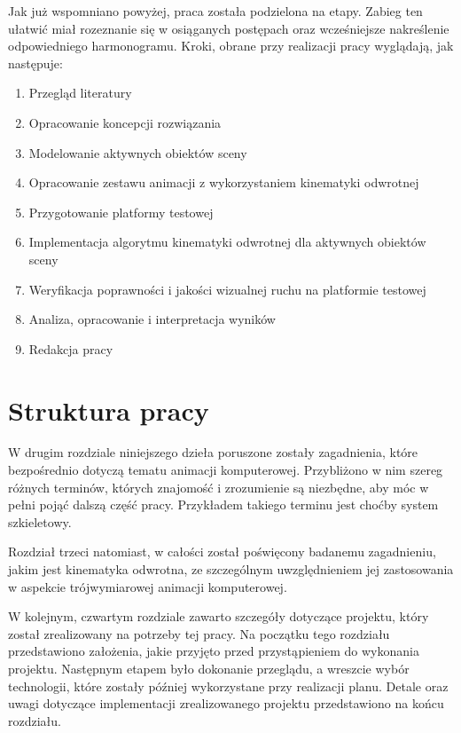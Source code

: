 \documentclass[11pt]{mwrep}
\begin{document}
  Jak już wspomniano powyżej, praca została podzielona na etapy. Zabieg ten ułatwić miał rozeznanie się w osiąganych postępach oraz wcześniejsze nakreślenie odpowiedniego harmonogramu. Kroki, obrane przy realizacji pracy wyglądają, jak następuje:

  \begin{enumerate}

  \item Przegląd literatury
  \item Opracowanie koncepcji rozwiązania
  \item Modelowanie aktywnych obiektów sceny
  \item Opracowanie zestawu animacji z wykorzystaniem kinematyki odwrotnej
  \item Przygotowanie platformy testowej
  \item Implementacja algorytmu kinematyki odwrotnej dla aktywnych obiektów sceny
  \item Weryfikacja poprawności i jakości wizualnej ruchu na platformie testowej
  \item Analiza, opracowanie i interpretacja wyników
  \item Redakcja pracy

  \end{enumerate}

  \section{Struktura pracy}

  W drugim rozdziale niniejszego dzieła poruszone zostały zagadnienia, które bezpośrednio dotyczą tematu animacji komputerowej. Przybliżono w nim szereg różnych terminów, których znajomość i zrozumienie są niezbędne, aby móc w pełni pojąć dalszą część pracy. Przykładem takiego terminu jest choćby system szkieletowy.

  Rozdział trzeci natomiast, w całości został poświęcony badanemu zagadnieniu, jakim jest kinematyka odwrotna, ze szczególnym uwzględnieniem jej zastosowania w aspekcie trójwymiarowej animacji komputerowej.
  
  W kolejnym, czwartym rozdziale zawarto szczegóły dotyczące projektu, który został zrealizowany na potrzeby tej pracy. Na początku tego rozdziału przedstawiono założenia, jakie przyjęto przed przystąpieniem do wykonania projektu. Następnym etapem było dokonanie przeglądu, a wreszcie wybór technologii, które zostały później wykorzystane przy realizacji planu. Detale oraz uwagi dotyczące implementacji zrealizowanego projektu przedstawiono na końcu rozdziału.
\end{document}
